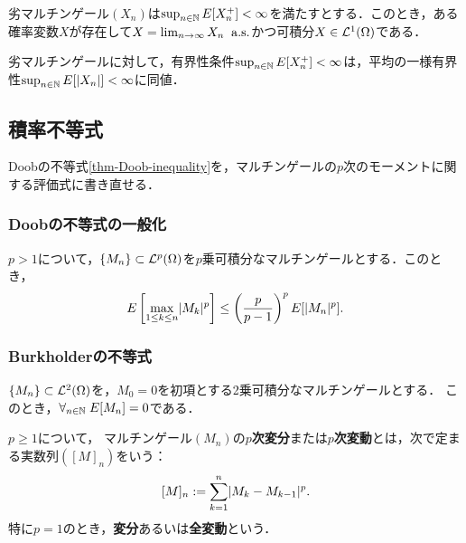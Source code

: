\documentclass[uplatex,dvipdfmx]{jsreport}
\begin{document}
\begin{theorem}
    劣マルチンゲール$(X_n)$は$\sup_{n\in\mathbb{N}}E[X_n^+]<\infty$を満たすとする．このとき，ある確率変数$X$が存在して$X=\lim_{n\to\infty}X_n\;\;\mathrm{a.s.}$かつ可積分$X\in\mathcal{L}^1(\Omega)$である．
\end{theorem}
\begin{remarks}
    劣マルチンゲールに対して，有界性条件$\sup_{n\in\mathbb{N}}E[X_n^+]<\infty$は，平均の一様有界性$\sup_{n\in\mathbb{N}}E[\lvert X_n\rvert]<\infty$に同値．
\end{remarks}

\subsection{積率不等式}

\begin{tcolorbox}[colframe=ForestGreen, colback=ForestGreen!10!white,breakable,colbacktitle=ForestGreen!40!white,coltitle=black,fonttitle=\bfseries\sffamily,
title=]
    Doobの不等式\ref{thm-Doob-inequality}を，マルチンゲールの$p$次のモーメントに関する評価式に書き直せる．
\end{tcolorbox}

\subsubsection{Doobの不等式の一般化}

\begin{theorem}
    $p>1$について，$\{M_n\}\subset\mathcal{L}^p(\Omega)$を$p$乗可積分なマルチンゲールとする．このとき，
    \[E\left[\max_{1\le k\le n}\lvert M_k\rvert^p\right]\le\left(\frac{p}{p-1}\right)^pE[\lvert M_n\rvert^p].\]
\end{theorem}

\subsubsection{Burkholderの不等式}

\begin{notation}
    $\{M_n\}\subset\mathcal{L}^2(\Omega)$を，$M_0=0$を初項とする2乗可積分なマルチンゲールとする．
    このとき，$\forall_{n\in\mathbb{N}}\;E[M_n]=0$である．
\end{notation}

\begin{definition}
    $p\ge 1$について，
    マルチンゲール$(M_n)$の\textbf{$p$次変分}または\textbf{$p$次変動}とは，次で定まる実数列$([M]_n)$をいう：
    \[[M]_n:=\sum^n_{k=1}\lvert M_k-M_{k-1}\rvert^p.\]
    特に$p=1$のとき，\textbf{変分}あるいは\textbf{全変動}という．
\end{definition}
\end{document}
